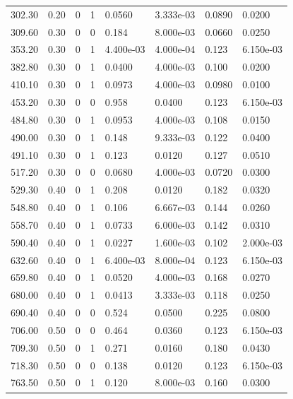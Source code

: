 \documentclass[preview]{standalone}
\begin{document}
{{\begin{tabular}{L{1.2cm}C{1.2cm} C{0.3cm}C{0.5cm} C{1.4cm}C{1.4cm} C{1.4cm}C{1.4cm}}
  302.30  &  0.20  & 0     &  1 &  0.0560  & 3.333e-03  & 0.0890 &  0.0200   \\ 
  309.60  &  0.30  & 0     &  0 &  0.184  & 8.000e-03  & 0.0660 &  0.0250   \\ 
  353.20  &  0.30  & 0     &  1 &  4.400e-03  & 4.000e-04  & 0.123 &  6.150e-03   \\ 
  382.80  &  0.30  & 0     &  1 &  0.0400  & 4.000e-03  & 0.100 &  0.0200   \\ 
  410.10  &  0.30  & 0     &  1 &  0.0973  & 4.000e-03  & 0.0980 &  0.0100   \\ 
  453.20  &  0.30  & 0     &  0 &  0.958  & 0.0400  & 0.123 &  6.150e-03   \\ 
  484.80  &  0.30  & 0     &  1 &  0.0953  & 4.000e-03  & 0.108 &  0.0150   \\ 
  490.00  &  0.30  & 0     &  1 &  0.148  & 9.333e-03  & 0.122 &  0.0400   \\ 
  491.10  &  0.30  & 0     &  1 &  0.123  & 0.0120  & 0.127 &  0.0510   \\ 
  517.20  &  0.30  & 0     &  0 &  0.0680  & 4.000e-03  & 0.0720 &  0.0300   \\ 
  529.30  &  0.40  & 0     &  1 &  0.208  & 0.0120  & 0.182 &  0.0320   \\ 
  548.80  &  0.40  & 0     &  1 &  0.106  & 6.667e-03  & 0.144 &  0.0260   \\ 
  558.70  &  0.40  & 0     &  1 &  0.0733  & 6.000e-03  & 0.142 &  0.0310   \\ 
  590.40  &  0.40  & 0     &  1 &  0.0227  & 1.600e-03  & 0.102 &  2.000e-03   \\ 
  632.60  &  0.40  & 0     &  1 &  6.400e-03  & 8.000e-04  & 0.123 &  6.150e-03   \\ 
  659.80  &  0.40  & 0     &  1 &  0.0520  & 4.000e-03  & 0.168 &  0.0270   \\ 
  680.00  &  0.40  & 0     &  1 &  0.0413  & 3.333e-03  & 0.118 &  0.0250   \\ 
  690.40  &  0.40  & 0     &  0 &  0.524  & 0.0500  & 0.225 &  0.0800   \\ 
  706.00  &  0.50  & 0     &  0 &  0.464  & 0.0360  & 0.123 &  6.150e-03   \\ 
  709.30  &  0.50  & 0     &  1 &  0.271  & 0.0160  & 0.180 &  0.0430   \\ 
  718.30  &  0.50  & 0     &  0 &  0.138  & 0.0120  & 0.123 &  6.150e-03   \\ 
  763.50  &  0.50  & 0     &  1 &  0.120  & 8.000e-03  & 0.160 &  0.0300   \\ 

\end{tabular}}}
\end{document}

